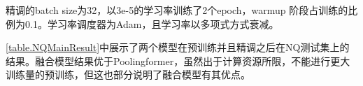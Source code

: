 精调的batch size为32，以3e-5的学习率训练了2个epoch，warmup 阶段占训练的比例为0.1。学习率调度器为Adam\cite{kingma2014adam}，且学习率以多项式方式衰减。

\begin{table}[ht]
\caption{经过预训练与精调之后，Poolingformer与融合模型在NQ测试集上的结果。包括长答案（LA）与短答案（SA）的精确率（P），召回率（R），与F1分数。}
\label{table.NQMainResult}
\begin{center}
\end{center}
\end{table}

\autoref{table.NQMainResult}中展示了两个模型在预训练并且精调之后在NQ测试集上的结果。融合模型结果优于Poolingformer，虽然出于计算资源所限，不能进行更大训练量的预训练，但这也部分说明了融合模型有其优点。
